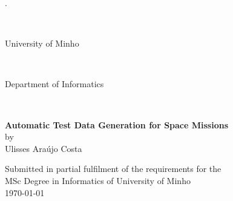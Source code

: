\thispagestyle{empty}
\begin{center}
\begin{tiny}.\end{tiny}\\
\vspace{3.5cm}
\begin{huge} University of Minho \end{huge} \\
\vspace{0.3cm}
\begin{LARGE} Department of Informatics \end{LARGE} \\
\vspace{5cm}

\begin{large}
\textbf{Automatic Test Data Generation for Space Missions}\\
\vspace{0.2cm}
by\\ 
\vspace{0.2cm}
Ulisses Araújo Costa\\
\end{large}

\vspace{8cm}
Submitted in partial fulfilment of the requirements for the \\
MSc Degree in Informatics of University of Minho\\
\vspace{2cm}
\today\\
\end{center} 
